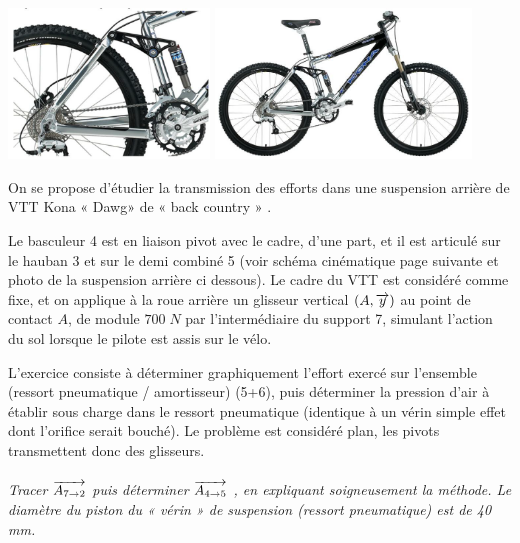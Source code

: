 \documentclass[11pt,oneside]{article}
\begin{document}
\begin{center}
\includegraphics[height=4cm]{png/img1}
\hspace{1.5cm}
\includegraphics[height=4cm]{png/img2}
\end{center}

On se propose d’étudier la transmission des efforts dans une suspension arrière de VTT Kona
« Dawg» de « back country » .

Le basculeur 4 est en liaison pivot avec le cadre, d'une part, et il est articulé sur le hauban 3 et sur le
demi combiné 5 (voir schéma cinématique page suivante et photo de la suspension arrière ci
dessous).
Le cadre du VTT est considéré comme fixe, et on applique à la roue arrière un glisseur vertical $(A,\overrightarrow{y})$
au point de contact $A$, de module $700\;N$ par l'intermédiaire du support 7, simulant l’action du sol
lorsque le pilote est assis sur le vélo.

L'exercice consiste à déterminer graphiquement l’effort exercé sur l’ensemble (ressort pneumatique
/ amortisseur) (5+6), puis déterminer la pression d’air à établir sous charge dans le ressort
pneumatique (identique à un vérin simple effet dont l’orifice serait bouché).
Le problème est considéré plan, les pivots transmettent donc des glisseurs.

\paragraph{}
\textit{Tracer $\overrightarrow{A_{7\rightarrow2}}$ puis déterminer $\overrightarrow{A_{4\rightarrow5}}$ , en expliquant soigneusement la méthode.
Le diamètre du piston du « vérin » de suspension (ressort pneumatique) est de 40 mm.}
\end{document}
